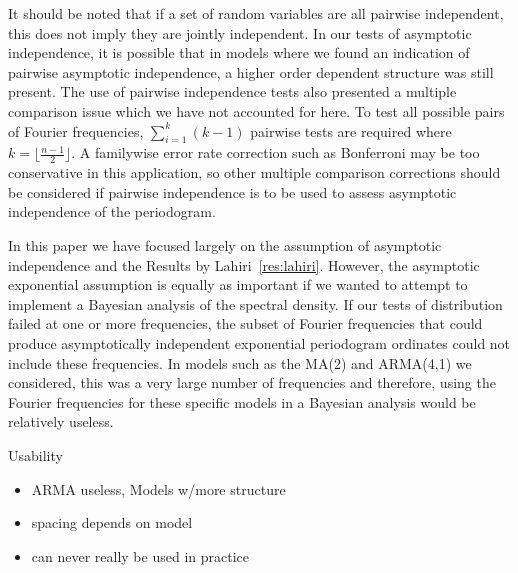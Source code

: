 \documentclass{article}\usepackage{graphicx, color}
\newcommand{\mj}[1]{{\color{blue} #1}}
\theoremstyle{plain}
\begin{document}
It should be noted that if a set of random variables are all pairwise independent, this does not imply they are jointly independent. In our tests of asymptotic independence, it is possible that in models where we found an indication of pairwise asymptotic independence, a higher order dependent structure was still present. The use of pairwise independence tests also presented a multiple comparison issue which we have not accounted for here. To test all possible pairs of Fourier frequencies, $\sum_{i=1}^k (k-1)$ pairwise tests are required where $k=\lfloor\frac{n-1}{2}\rfloor$. A familywise error rate correction such as Bonferroni may be too conservative in this application, so other multiple comparison corrections should be considered if pairwise independence is to be used to assess asymptotic independence of the periodogram.

In this paper we have focused largely on the assumption of asymptotic independence and the Results by Lahiri~\ref{res:lahiri}. However, the asymptotic exponential assumption is equally as important if we wanted to attempt to implement a Bayesian analysis of the spectral density. If our tests of distribution failed at one or more frequencies, the subset of Fourier frequencies that could produce asymptotically independent exponential periodogram ordinates could not include these frequencies. In models such as the MA(2) and ARMA(4,1) we considered, this was a very large number of frequencies and therefore, using the Fourier frequencies for these specific models in a Bayesian analysis would be relatively useless. 


\mj{
Usability 
  \begin{itemize}
    \item ARMA useless, Models w/more structure 
    \item spacing depends on model
    \item can never really be used in practice
  \end{itemize}
}


\printbibliography
\end{document}
